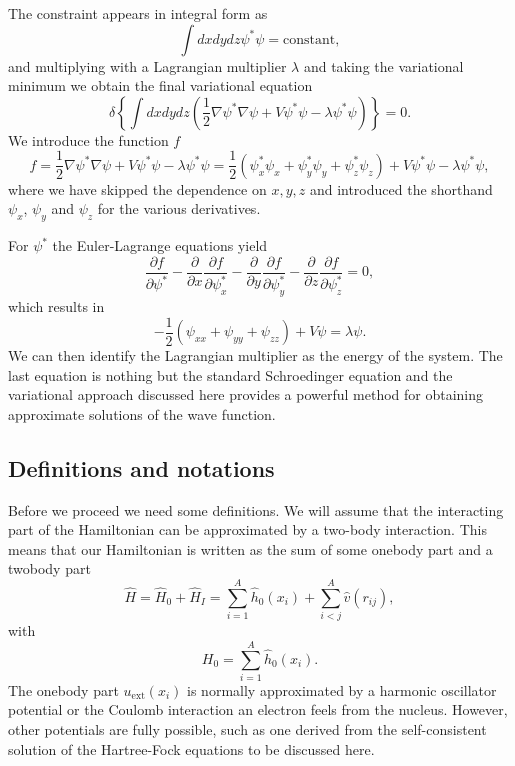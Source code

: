 \documentclass[%
oneside,                 %
final,                   %
10pt]{article}
\begin{document}
The constraint appears in integral form as 
\[
 \int dxdydz \psi^* \psi=\mathrm{constant},
\]
and multiplying with a Lagrangian multiplier $\lambda$ and taking the variational minimum we obtain the final variational equation
\[
\delta \left\{\int dxdydz\left( \frac{1}{2}\nabla\psi^*\nabla\psi+V\psi^*\psi-\lambda\psi^*\psi\right)\right\} = 0.
\]
We introduce the function  $f$
\[
  f =  \frac{1}{2}\nabla\psi^*\nabla\psi+V\psi^*\psi-\lambda\psi^*\psi=
\frac{1}{2}(\psi^*_x\psi_x+\psi^*_y\psi_y+\psi^*_z\psi_z)+V\psi^*\psi-\lambda\psi^*\psi,
\]
where we have skipped the dependence on $x,y,z$ and introduced the shorthand $\psi_x$, $\psi_y$ and $\psi_z$  for the various derivatives.

For $\psi^*$ the Euler-Lagrange  equations yield
\[
\frac{\partial f}{\partial \psi^*}- \frac{\partial }{\partial x}\frac{\partial f}{\partial \psi^*_x}-\frac{\partial }{\partial y}\frac{\partial f}{\partial \psi^*_y}-\frac{\partial }{\partial z}\frac{\partial f}{\partial \psi^*_z}=0,
\] 
which results in 
\[
    -\frac{1}{2}(\psi_{xx}+\psi_{yy}+\psi_{zz})+V\psi=\lambda \psi.
\]
We can then identify the  Lagrangian multiplier as the energy of the system. The last equation is 
nothing but the standard 
Schroedinger equation and the variational  approach discussed here provides 
a powerful method for obtaining approximate solutions of the wave function.

\subsection{Definitions and notations}

Before we proceed we need some definitions.
We will assume that the interacting part of the Hamiltonian
can be approximated by a two-body interaction.
This means that our Hamiltonian is written as the sum of some onebody part and a twobody part
\begin{equation}
    \hat{H} = \hat{H}_0 + \hat{H}_I 
    = \sum_{i=1}^A \hat{h}_0(x_i) + \sum_{i < j}^A \hat{v}(r_{ij}),
\label{Hnuclei}
\end{equation}
with 
\begin{equation}
  H_0=\sum_{i=1}^A \hat{h}_0(x_i).
\label{hinuclei}
\end{equation}
The onebody part $u_{\mathrm{ext}}(x_i)$ is normally approximated by a harmonic oscillator potential or the Coulomb interaction an electron feels from the nucleus. However, other potentials are fully possible, such as 
one derived from the self-consistent solution of the Hartree-Fock equations to be discussed here.
\end{document}
